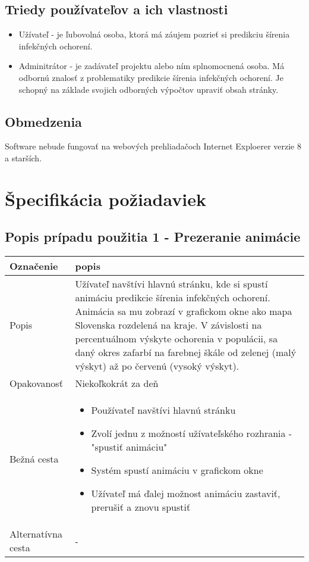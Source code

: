 \documentclass[12pt,a4paper]{report}
\begin{document}
\section[Triedy používateľov a ich vlastnosti]{\rmfamily\bfseries
	Triedy používateľov a ich vlastnosti}
\begin{itemize}
	\item Užívateľ - je ľubovolná osoba, ktorá má záujem pozrieť si predikciu šírenia infekčných ochorení.
	\item Adminitrátor - je zadávateľ projektu alebo ním splnomocnená osoba. Má odbornú znalosť z problematiky predikcie šírenia infekčných ochorení. Je schopný
na základe svojich odborných výpočtov upraviť obsah stránky.
\end{itemize}

\section[Obmedzenia]{\rmfamily\bfseries
	Obmedzenia}
	Software nebude fungovať na webových prehliadačoch Internet Exploerer verzie 8 a starších. 

\renewcommand{\chaptername}{}	
\chapter[Špecifikácia požiadaviek]{\rmfamily\bfseries
	Špecifikácia požiadaviek}
\section[Popis prípadu použitia 1 - Prezeranie animácie]{\rmfamily\bfseries
	Popis prípadu použitia 1 - Prezeranie animácie}
\begin{table}[h!]
	\centering
	\begin{tabular}{|>{\centering\arraybackslash}m{3in}|>{\centering\arraybackslash}m{3in}|}
		\hline
		\centering Označenie & popis \\ [0ex]
		\hline
		Popis & Užívateľ navštívi hlavnú stránku, kde si spustí animáciu predikcie šírenia infekčných ochorení. Animácia sa mu
		zobrazí v grafickom okne ako mapa Slovenska rozdelená na kraje. V závislosti na percentuálnom výskyte ochorenia
		v populácii, sa daný okres zafarbí na farebnej škále od zelenej (malý výskyt) až po červenú (vysoký výskyt).\\ [0ex]
		\hline
		Opakovanosť & Niekoľkokrát za deň \\ [0ex]
		\hline
		Bežná cesta & 	\begin{itemize}
							\item Používateľ navštívi hlavnú stránku 
							\item Zvolí jednu z možností užívateľského rozhrania - "spustiť animáciu"
							\item Systém spustí animáciu v grafickom okne
							\item Užívateľ má ďalej možnost animáciu zastaviť, prerušiť a znovu spustiť
						\end{itemize} \\ [0ex]
		\hline
		Alternatívna cesta & - \\ [0ex]
		\hline
	\end{tabular}
\end{table}
\end{document}
